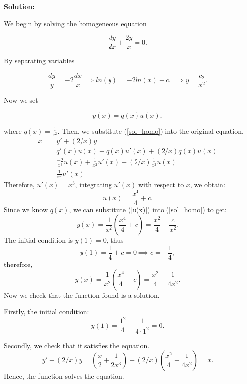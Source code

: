 \documentclass{article}
\renewcommand{\thesubsection}{\thesection.\alph{subsection}} %
\begin{document}
\textbf{Solution:}

		We begin by solving the homogeneous equation

		\[ \frac{dy}{dx} + \frac{2y}{x} = 0.\]

		By separating variables

		\[\frac{dy}{y} = -2\frac{dx}{x} \implies ln(y) = -2ln(x) + c_1 \implies y = \frac{c_2}{x^2}.\]

		Now we set

		\begin{equation} \label{sol_homo}
			y(x) = q(x)u(x),
		\end{equation}

		where $q(x) = \frac{1}{x^2}$. Then, we substitute (\ref{sol_homo}) into the original equation,
       \begin{equation*}
	         \begin{aligned}
	        	x&=y' + (2/x)y \\
	        	&=q'(x)u(x) +q(x)u'(x) + (2/x)q(x)u(x) \\
	        	&=\frac{-2}{x^3}	u(x) +\frac{1}{x^2}u'(x) + (2/x)\frac{1}{x^2}u(x)\\
	        	&=\frac{1}{x^2}u'(x)
	         \end{aligned}
       \end{equation*}
    Therefore, $u'(x) = x^3$, integrating $u'(x)$ with respect to $x$, we obtain:
        \begin{equation}\label{u(x)}
        	u(x) = \frac{x^4}{4} + c .
        \end{equation} 
		Since we know $q(x)$, we can substitute (\ref{u(x)}) into (\ref{sol_homo}) to get:
		\[y(x) = \frac{1}{x^2}\left(\frac{x^4}{4}+c\right) = \frac{x^2}{4} + \frac{c}{x^2}.\]
		The initial condition is $y(1)=0$, thus \[ y(1)=\frac{1}{4} + c= 0 \implies c=-\frac{1}{4},\]
		therefore,
		\[y(x) = \frac{1}{x^2}\left(\frac{x^4}{4}+c\right) = \frac{x^2}{4} - \frac{1}{4x^2}.\]
		Now we check that the function found is a solution.

		Firstly, the initial condition:
		\[y(1)= \frac{1^2}{4} - \frac{1}{4\cdot 1^2} =0.\]

		Secondly, we check that it satisfies the equation.
		\[y'+(2/x)y = \left(\frac{x}{2} + \frac{1}{2x^3}\right) +(2/x)\left(\frac{x^2}{4} - \frac{1}{4x^2}\right) = x.\]
		Hence, the function solves the equation.

\end{document}
